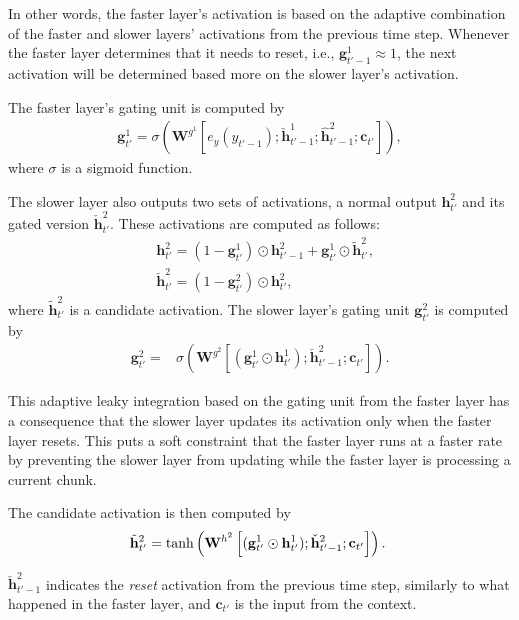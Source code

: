 \documentclass[11pt]{article}
\newcommand{\vect}[1]{\mathbf{#1}}
\newcommand{\matr}[1]{\mathbf{#1}}
\newcommand{\vc}[0]{\vect{c}}
\newcommand{\vh}[0]{\vect{h}}
\newcommand{\vg}[0]{\vect{g}}
\newcommand{\mW}[0]{\matr{W}}
\begin{document}
In other words, the faster layer's activation is based on the adaptive
combination of the faster and slower layers' activations from the previous time
step. Whenever the faster layer determines that it needs to reset, i.e.,
$\vg^1_{t'-1} \approx 1$, the next activation will be determined based more on
the slower layer's activation. 

The faster layer's gating unit is computed by
\begin{align*}
    \vg^1_{t'} = \sigma\left( 
        \mW^{g^1} \left[ e_y(y_{t'-1}); 
        \check{\vh}^1_{t'-1}; \hat{\vh}^2_{t'-1}; \vc_{t'}\right] 
    \right),
\end{align*}
where $\sigma$ is a sigmoid function.

The slower layer also outputs two sets of activations, a normal output
$\vh^2_{t'}$ and its gated version $\check{\vh}^2_{t'}$. These activations are 
computed as follows: 
\begin{align*}
    &\vh^2_{t'} = 
    (1 - \vg^1_{t'}) \odot \vh^2_{t'-1} +
    \vg^1_{t'} \odot \tilde{\vh}^2_{t'}, \\
    &\check{\vh}^2_{t'} = (1 - \vg^2_{t'}) \odot \vh^2_{t'},
\end{align*}
where $\tilde{\vh}^2_{t'}$ is a candidate activation. The slower layer's gating
unit $\vg^2_{t'}$ is computed by
\begin{align*}
    \vg^2_{t'} =& \sigma\left(\mW^{g^2}
    \left[(\vg^1_{t'} \odot \vh^1_{t'}) ;
    \check{\vh}^2_{t'-1};
\vc_{t'}\right]\right).
\end{align*}

This adaptive leaky integration based on the gating unit from the faster layer
has a consequence that the slower layer updates its activation only when the
faster layer resets. This puts a soft constraint that the faster layer runs at a
faster rate by preventing the slower layer from updating while the faster layer
is processing a current chunk.

The candidate activation is then computed by
\begin{align}
    \label{eq:slow_act}
    \hspace*{-0.1cm}
    \tilde{\vh}^2_{t'} = 
    \tanh\left(
    \mW^{h^2}\left[(\vg^1_{t'}\odot\vh^1_{t'}); \check{\vh}^2_{t'-1}; \vc_{t'}\right]\right).
\end{align}

$\check{\vh}^2_{t'-1}$ indicates the {\em reset} activation from the previous time step,
similarly to what happened in the faster layer, 
and $\vc_{t'}$ is the input from the context. 
\end{document}
